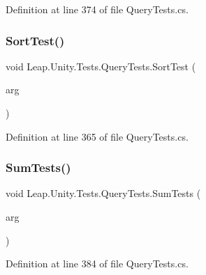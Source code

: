 Definition at line 374 of file Query\+Tests.\+cs.

\mbox{\label{class_leap_1_1_unity_1_1_tests_1_1_query_tests_ab85c5fe055b651124deddaa512648c8d}} 
\subsubsection{\texorpdfstring{SortTest()}{SortTest()}}
{\footnotesize\ttfamily void Leap.\+Unity.\+Tests.\+Query\+Tests.\+Sort\+Test (\begin{DoxyParamCaption}\item[{\mbox{[}\+Value\+Source(\char`\"{}list0\char`\"{})\mbox{]} \mbox{\hyperlink{class_leap_1_1_unity_1_1_tests_1_1_query_tests_1_1_query_arg}{Query\+Arg}}}]{arg }\end{DoxyParamCaption})}



Definition at line 365 of file Query\+Tests.\+cs.

\mbox{\label{class_leap_1_1_unity_1_1_tests_1_1_query_tests_ad29d20b0c9c0262b198dbc55e9c83237}} 
\subsubsection{\texorpdfstring{SumTests()}{SumTests()}}
{\footnotesize\ttfamily void Leap.\+Unity.\+Tests.\+Query\+Tests.\+Sum\+Tests (\begin{DoxyParamCaption}\item[{\mbox{[}\+Value\+Source(\char`\"{}list0\char`\"{})\mbox{]} \mbox{\hyperlink{class_leap_1_1_unity_1_1_tests_1_1_query_tests_1_1_query_arg}{Query\+Arg}}}]{arg }\end{DoxyParamCaption})}



Definition at line 384 of file Query\+Tests.\+cs.

\mbox{\label{class_leap_1_1_unity_1_1_tests_1_1_query_tests_afb330f57ceaa257a37d3e5fdde110e68}} 
